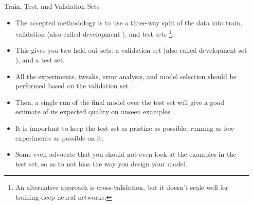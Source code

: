 \documentclass[handout]{beamer}
\begin{document}
\begin{frame}{Train, Test, and Validation Sets}
\begin{scriptsize}
\begin{itemize}
\item The accepted methodology is to use a three-way split of the data into train, validation (also called development ), and test sets \footnote{An alternative approach is cross-validation, but it doesn't scale well for training deep neural networks.}. 
\item This gives you two held-out sets: a validation set (also called development set ), and a test set.
\item All the experiments, tweaks, error analysis, and model selection should be performed based on the validation set. 
\item Then, a single run of the final model over the test set will give a good estimate of its expected quality on unseen examples. 
\item It is important to keep the test set as pristine as possible, running as few experiments as possible on it. 
\item Some even advocate that you should not even look at the examples in the test
set, so as to not bias the way you design your model.



\end{itemize}

\end{scriptsize}
\end{frame}
\end{document}
